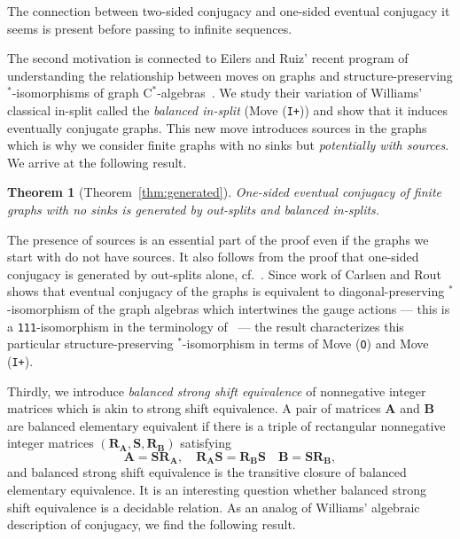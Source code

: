 \documentclass[12pt,a4paper,oneside,reqno,final]{amsart}
\newtheorem*{theorem*}{Theorem}
\theoremstyle{definition}
\numberwithin{equation}{section} %
\begin{document}
The connection between two-sided conjugacy and one-sided eventual conjugacy it seems
is present before passing to infinite sequences.


The second motivation is connected to Eilers and Ruiz' recent program of understanding the relationship between moves on graphs 
and structure-preserving $^*$-isomorphisms of graph $\mathrm{C^*}$-algebras~\cite{Eilers-Ruiz}.
We study their variation of Williams' classical in-split called the \emph{balanced in-split} (Move (\texttt{I+})) and show that it induces eventually conjugate graphs.
This new move introduces sources in the graphs which is why we consider finite graphs with no sinks but \emph{potentially with sources}.
We arrive at the following result.

\begin{theorem*}[Theorem~\ref{thm:generated}]
    One-sided eventual conjugacy of finite graphs with no sinks is generated by out-splits and balanced in-splits.    
\end{theorem*}

The presence of sources is an essential part of the proof even if the graphs we start with do not have sources.
It also follows from the proof that one-sided conjugacy is generated by out-splits alone, cf.~\cite{Williams1973, Boyle-Franks-Kitchens, Kitchens}.
Since work of Carlsen and Rout~\cite{Carlsen-Rout} shows that 
eventual conjugacy of the graphs is equivalent to diagonal-preserving $^*$-isomorphism of the graph algebras which intertwines the gauge actions
--- this is a \texttt{111}-isomorphism in the terminology of~\cite{Eilers-Ruiz} ---
the result characterizes this particular structure-preserving $^*$-isomorphism in terms of Move (\texttt{O}) and Move (\texttt{I+}).

Thirdly, we introduce \emph{balanced strong shift equivalence} of nonnegative integer matrices which is akin to strong shift equivalence.
A pair of matrices \textbf{A} and \textbf{B} are balanced elementary equivalent if there is a triple of rectangular nonnegative integer matrices $(\textbf{R}_\textbf{A}, \textbf{S}, \textbf{R}_\textbf{B})$
satisfying
\[
    \textbf{A} = \textbf{S} \textbf{R}_\textbf{A}, \quad \textbf{R}_\textbf{A} \textbf{S} = \textbf{R}_\textbf{B} \textbf{S} \quad \textbf{B} = \textbf{S} \textbf{R}_\textbf{B},
\]
and balanced strong shift equivalence is the transitive closure of balanced elementary equivalence.
It is an interesting question whether balanced strong shift equivalence is a decidable relation.
As an analog of Williams' algebraic description of conjugacy, we find the following result.
\end{document}
